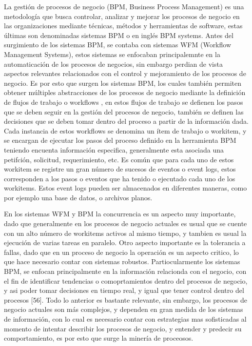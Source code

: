 La gestión de procesos de negocio (BPM, Business Process Management) es una metodología que busca controlar, analizar y mejorar los procesos de negocio en las organizaciones mediante técnicas, métodos y herramientas de software, estas últimas son denominadas sistemas BPM o en inglés BPM systems. Antes del surgimiento de los sistemas BPM, se contaba con sistemas WFM (Workflow Management Systems), estos sistemas se enfocaban principalemnte en la automaticación de los procesos de negocios, sin embargo perdian de vista aspectos relevantes relacionados con el control y mejoramiento de los procesos de negocio. Es por esto que surgen los sistemas BPM, los cuales también permiten obtener múltiples abstracciones de los procesos de negocio mediante la definición de flujos de trabajo o workflows \cite{VanderAalst2004}, en estos flujos de trabajo se defienen los pasos que se deben seguir en la gestión del procesos de negocio, también se definen las decisiones que se deben tomar dentro del proceso a partir de la información dada. Cada instancia de estos workflows se denomina un ítem de trabajo o workitem, y se encargan de ejecutar los pasos del proceso definido en la herramienta BPM teniendo encuenta información especifica, generalmente esta asociada una petifción, solicitud, requerimiento, etc. Es común que para cada uno de estos workitem se registre un gran número de sucesos de eventos o event logs, estos corresponden a los pasos o eventos que ha tenido o ejecutado cada uno de los workitems. Estos event logs pueden ser almacenados en diferentes maneras, como por ejemplo una base de datos, o archivos planos. 

En los sistemas WFM y BPM la concurrencia es un aspecto muy importante, dado que generalmente en los procesos de negocio actuales es usual que se cuente con un alto número de workitems activos al mismo tiempo, y tambien es usual la ejecución de varias tareas en paralelo. Otro aspecto importante es la tolerancia a fallas, dado que en un proceso de negocio la operación es un aspecto critico, lo que hace necesario contar con sistemas robustos. Partiocularmente los sistemas BPM, se enfocan principalmente en la información relacionda con el negocio, con el fin de identificar tendencias o comoprtamientos dentro del procesos de negocio, y asi poder tomar decisiones en tiempo real, y igual que tener control dentro del procesos [56]. Todo lo anterior es bastante relevante, sin embargo, los procesos de negocio actuales son más complejos, y dependen en gran medida de los sistemas de información, con lo cual es necesario contar con estrategias mas sofisticadas al momento de intentar describir los procesos de negocio, y entender y predecir su comportamiento, es por esto que surge la minería de proceosos.

